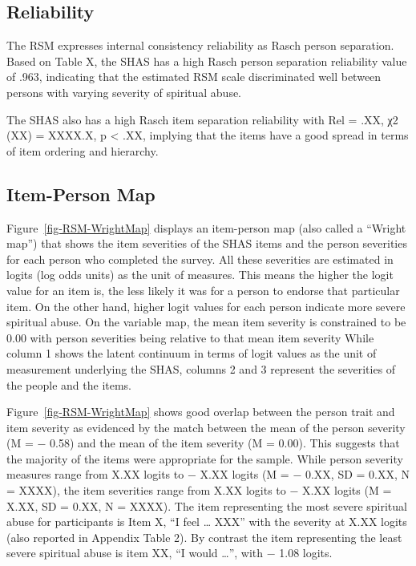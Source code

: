 \documentclass[
  letterpaper,
  DIV=11,
  numbers=noendperiod]{scrreport}
\begin{document}
\hypertarget{reliability}{%
\subsection*{Reliability}\label{reliability}}

The RSM expresses internal consistency reliability as Rasch person
separation. Based on Table X, the SHAS has a high Rasch person
separation reliability value of .963, indicating that the estimated RSM
scale discriminated well between persons with varying severity of
spiritual abuse.

The SHAS also has a high Rasch item separation reliability with Rel =
.XX, χ2 (XX) = XXXX.X, p \textless{} .XX, implying that the items have a
good spread in terms of item ordering and hierarchy.

\hypertarget{item-person-map}{%
\subsection*{Item-Person Map}\label{item-person-map}}

Figure~\ref{fig-RSM-WrightMap} displays an item-person map (also called
a ``Wright map'') that shows the item severities of the SHAS items and
the person severities for each person who completed the survey. All
these severities are estimated in logits (log odds units) as the unit of
measures. This means the higher the logit value for an item is, the less
likely it was for a person to endorse that particular item. On the other
hand, higher logit values for each person indicate more severe spiritual
abuse. On the variable map, the mean item severity is constrained to be
0.00 with person severities being relative to that mean item severity
While column 1 shows the latent continuum in terms of logit values as
the unit of measurement underlying the SHAS, columns 2 and 3 represent
the severities of the people and the items.

Figure~\ref{fig-RSM-WrightMap} shows good overlap between the person
trait and item severity as evidenced by the match between the mean of
the person severity (M = − 0.58) and the mean of the item severity (M =
0.00). This suggests that the majority of the items were appropriate for
the sample. While person severity measures range from X.XX logits to −
X.XX logits (M = − 0.XX, SD = 0.XX, N = XXXX), the item severities range
from X.XX logits to − X.XX logits (M = X.XX, SD = 0.XX, N = XXXX). The
item representing the most severe spiritual abuse for participants is
Item X, ``I feel \ldots{} XXX'' with the severity at X.XX logits (also
reported in Appendix Table 2). By contrast the item representing the
least severe spiritual abuse is item XX, ``I would \ldots{}'', with −
1.08 logits.
\end{document}
